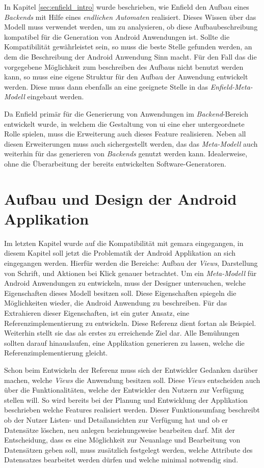 In Kapitel \ref{sec:enfield_intro} wurde beschrieben, wie Enfield den Aufbau eines \textit{Backends} mit Hilfe eines \textit{endlichen Automaten} realisiert. Dieses Wissen über das Modell muss verwendet werden, um zu analysieren, ob diese Aufbaubeschreibung kompatibel für die Generation von Android Anwendungen ist. Sollte die Kompatibilität gewährleistet sein, so muss die beste Stelle gefunden werden, an dem die Beschreibung der Android Anwendung Sinn macht. Für den Fall das die vorgegebene Möglichkeit zum beschreiben des Aufbaus nicht benutzt werden kann, so muss eine eigene Struktur für den Aufbau der Anwendung entwickelt werden. Diese muss dann ebenfalls an eine geeignete Stelle in das \textit{Enfield-Meta-Modell} eingebaut werden.

\newpage

Da Enfield primär für die Generierung von Anwendungen im \textit{Backend}-Bereich entwickelt wurde, in welchem die Gestaltung von \acf{ui} eine eher untergeordnete Rolle spielen, muss die Erweiterung auch dieses Feature realisieren. Neben all diesen Erweiterungen muss auch sichergestellt werden, das das \textit{Meta-Modell} auch weiterhin für das generieren von \textit{Backends} genutzt werden kann. Idealerweise, ohne die Überarbeitung der bereits entwickelten Software-Generatoren. 

\section{Aufbau und Design der Android Applikation}
Im letzten Kapitel wurde auf die Kompatibilität mit \ac{gemara} eingegangen, in diesem Kapitel soll jetzt die Problematik der Android Applikation an sich eingegangen werden. Hierfür werden die Bereiche: Aufbau der \textit{Views}, Darstellung von Schrift, und Aktionen bei Klick genauer betrachtet. Um ein \textit{Meta-Modell} für Android Anwendungen zu entwickeln, muss der Designer untersuchen, welche Eigenschaften dieses Modell besitzen soll. Diese Eigenschaften spiegeln die Möglichkeiten wieder, die Android Anwendung zu beschreiben. Für das Extrahieren dieser Eigenschaften, ist ein guter Ansatz, eine Referenzimplementierung zu entwickeln. Diese Referenz dient fortan als Beispiel. Weiterhin stellt sie das als erstes zu erreichende Ziel dar. Alle Bemühungen sollten darauf hinauslaufen, eine Applikation generieren zu lassen, welche die Referenzimplementierung gleicht.

Schon beim Entwickeln der Referenz muss sich der Entwickler Gedanken darüber machen, welche \textit{Views} die Anwendung besitzen soll. Diese \textit{Views} entscheiden auch über die Funktionalitäten, welche der Entwickler den Nutzern zur Verfügung stellen will. So wird bereits bei der Planung und Entwicklung der Applikation beschrieben welche Features realisiert werden. Dieser Funktionsumfang beschreibt ob der Nutzer Listen- und Detailansichten zur Verfügung hat und ob er Datensätze löschen, neu anlegen beziehungsweise bearbeiten darf. Mit der Entscheidung, dass es eine Möglichkeit zur Neuanlage und Bearbeitung von Datensätzen geben soll, muss zusätzlich festgelegt werden, welche Attribute des Datensatzes bearbeitet werden dürfen und welche minimal notwendig sind.

